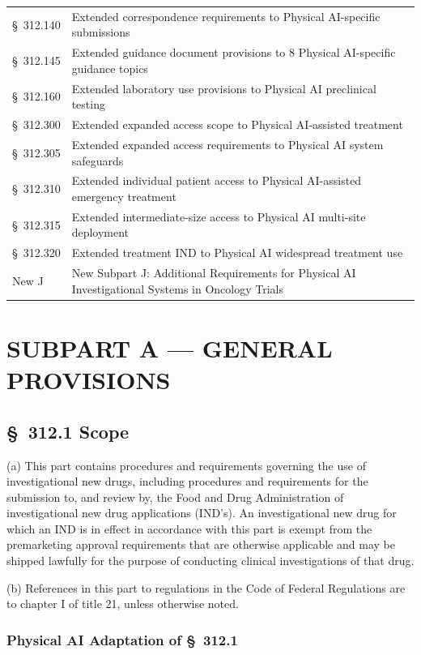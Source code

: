 \documentclass[11pt]{article}
\begin{document}
\begin{longtable}{>{\raggedright\arraybackslash}p{2.2cm} >{\raggedright\arraybackslash}p{11.5cm}}
\S~312.140 & Extended correspondence requirements to Physical AI-specific submissions \\
\S~312.145 & Extended guidance document provisions to 8 Physical AI-specific guidance topics \\
\S~312.160 & Extended laboratory use provisions to Physical AI preclinical testing \\
\S~312.300 & Extended expanded access scope to Physical AI-assisted treatment \\
\S~312.305 & Extended expanded access requirements to Physical AI system safeguards \\
\S~312.310 & Extended individual patient access to Physical AI-assisted emergency treatment \\
\S~312.315 & Extended intermediate-size access to Physical AI multi-site deployment \\
\S~312.320 & Extended treatment IND to Physical AI widespread treatment use \\
New J & New Subpart J: Additional Requirements for Physical AI Investigational Systems in Oncology Trials \\
\end{longtable}

\clearpage

\section{SUBPART A --- GENERAL PROVISIONS}

\subsection{\S~312.1 Scope}

(a) This part contains procedures and requirements governing the use of investigational new drugs, including procedures and requirements for the submission to, and review by, the Food and Drug Administration of investigational new drug applications (IND's). An investigational new drug for which an IND is in effect in accordance with this part is exempt from the premarketing approval requirements that are otherwise applicable and may be shipped lawfully for the purpose of conducting clinical investigations of that drug.

(b) References in this part to regulations in the Code of Federal Regulations are to chapter I of title 21, unless otherwise noted.

\subsubsection{Physical AI Adaptation of \S~312.1}
\end{document}
